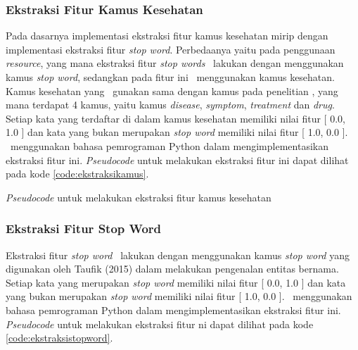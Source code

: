 \subsubsection{Ekstraksi Fitur Kamus Kesehatan}
Pada dasarnya implementasi ekstraksi fitur kamus kesehatan mirip dengan implementasi ekstraksi fitur \textit{stop word}. Perbedaanya yaitu pada penggunaan \textit{resource}, yang mana ekstraksi fitur \textit{stop words} \saya~lakukan dengan menggunakan kamus \textit{stop word}, sedangkan pada fitur ini \saya~menggunakan kamus kesehatan. Kamus kesehatan yang \saya~gunakan sama dengan kamus pada penelitian \cite{skripsiKakRadit}, yang mana terdapat 4 kamus, yaitu kamus \textit{disease}, \textit{symptom}, \textit{treatment} dan \textit{drug}. Setiap kata yang terdaftar di dalam kamus kesehatan memiliki nilai fitur [ 0.0, 1.0 ] dan kata yang bukan merupakan \textit{stop word} memiliki nilai fitur [ 1.0, 0.0 ]. \Saya~menggunakan bahasa pemrograman Python dalam mengimplementasikan ekstraksi fitur ini. \textit{Pseudocode} untuk melakukan ekstraksi fitur ini dapat dilihat pada kode \ref{code:ekstraksikamus}.

\begin{kode}
	
	
	\SetAlgoLined
	\BlankLine
	
	
	\caption{\textit{Pseudocode} untuk melakukan ekstraksi fitur kamus kesehatan}
	\label{code:ekstraksikamus}	
\end{kode}

\subsubsection{Ekstraksi Fitur Stop Word}
Ekstraksi fitur \textit{stop word} \saya~lakukan dengan menggunakan kamus \textit{stop word} yang digunakan oleh Taufik (2015) dalam melakukan pengenalan entitas bernama. Setiap kata yang merupakan \textit{stop word} memiliki nilai fitur [ 0.0, 1.0 ] dan kata yang bukan merupakan \textit{stop word} memiliki nilai fitur [ 1.0, 0.0 ]. \Saya~menggunakan bahasa pemrograman Python dalam mengimplementasikan ekstraksi fitur ini.
\textit{Pseudocode} untuk melakukan ekstraksi fitur ni dapat dilihat pada kode \ref{code:ekstraksistopword}.

